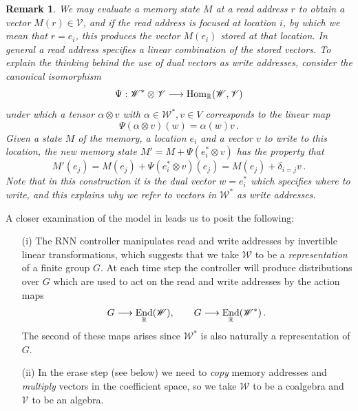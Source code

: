 \documentclass[english,letter paper,12pt,leqno]{article}
\theoremstyle{example}
\newtheorem{remark}[theorem]{Remark}
\numberwithin{equation}{section}
\def\Hom{\operatorname{Hom}}
\DeclareMathOperator{\End}{End}
\begin{document}
\begin{remark} We may evaluate a memory state $M$ at a read address $r$ to obtain a vector $M(r) \in \mathscr{V}$, and if the read address is \emph{focused} at location $i$, by which we mean that $r = e_i$, this produces the vector $M(e_i)$ stored at that location. In general a read address specifies a linear combination of the stored vectors. To explain the thinking behind the use of dual vectors as write addresses, consider the canonical isomorphism
\[
\Psi: \mathscr{W}^* \otimes \mathscr{V} \lto \Hom_{\mathbb{R}}(\mathscr{W},\mathscr{V})
\]
under which a tensor $\alpha \otimes v$ with $\alpha \in \mathscr{W}^*, v \in V$ corresponds to the linear map
\[
\Psi( \alpha \otimes v )(w) = \alpha(w) v\,.
\]
Given a state $M$ of the memory, a location $e_i$ and a vector $v$ to write to this location, the new memory state $M' = M + \Psi( e_i^* \otimes v )$ has the property that
\[
M'(e_j) = M(e_j) + \Psi( e_i^* \otimes v )(e_j) = M(e_j) + \delta_{i=j} v\,.
\]
Note that in this construction it is the dual vector $w = e_i^*$ which specifies \emph{where to write}, and this explains why we refer to vectors in $\mathscr{W}^*$ as write addresses. 
\end{remark}

A closer examination of the model in \cite{ntm} leads us to posit the following:

\begin{itemize}
\item[(i)] The RNN controller manipulates read and write addresses by invertible linear transformations, which suggests that we take $\mathscr{W}$ to be a \emph{representation} of a finite group $G$. At each time step the controller will produce distributions over $G$ which are used to act on the read and write addresses by the action maps
\[
G \lto \End_{\mathbb{R}}(\mathscr{W}), \qquad G \lto \End_{\mathbb{R}}(\mathscr{W}^*)\,.
\]
The second of these maps arises since $\mathscr{W}^*$ is also naturally a representation of $G$.
\item[(ii)] In the erase step (see below) we need to \emph{copy} memory addresses and \emph{multiply} vectors in the coefficient space, so we take $\mathscr{W}$ to be a coalgebra and $\mathscr{V}$ to be an algebra. %
\end{itemize}
\end{document}
